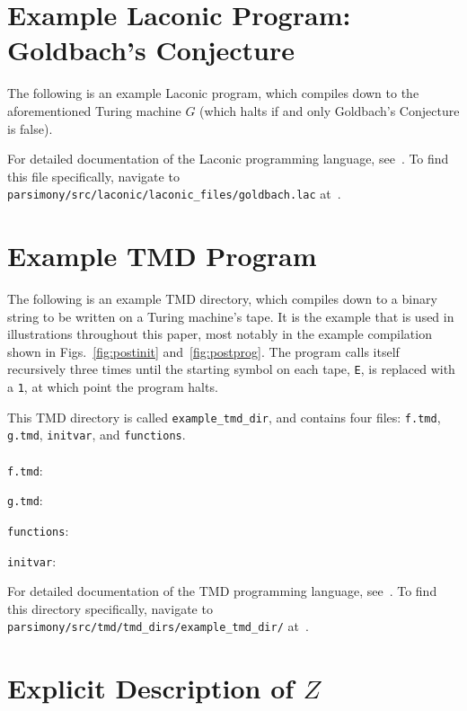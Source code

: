 \documentclass[11pt]{article}
\begin{document}
\begin{appendices}
    
\section{Example Laconic Program: Goldbach's Conjecture} \label{sec:applac}

The following is an example Laconic program, which compiles down to the aforementioned Turing machine $G$ (which halts if and only Goldbach's Conjecture is false).



For detailed documentation of the Laconic programming language, see~\cite{github}. To find this file specifically, navigate to \texttt{parsimony/src/laconic/laconic\_files/goldbach.lac} at~\cite{github}.

\section{Example TMD Program} \label{sec:apptmd}

The following is an example TMD directory, which compiles down to a binary string to be written on a Turing machine's tape. It is the example that is used in illustrations throughout this paper, most notably in the example compilation shown in Figs.~\ref{fig:postinit} and~\ref{fig:postprog}. The program calls itself recursively three times until the starting symbol on each tape, \texttt{E}, is replaced with a \texttt{1}, at which point the program halts.

This TMD directory is called \texttt{example\_tmd\_dir}, and contains four files: \texttt{f.tmd}, \texttt{g.tmd}, \texttt{initvar}, and \texttt{functions}. \\ \\

\texttt{f.tmd}:

\texttt{g.tmd}:

\texttt{functions}:

\texttt{initvar}:
 

For detailed documentation of the TMD programming language, see~\cite{github}. To find this directory specifically, navigate to \texttt{parsimony/src/tmd/tmd\_dirs/example\_tmd\_dir/} at~\cite{github}.

\section{Explicit Description of $Z$} \label{sec:explicitz}


\end{appendices}
\end{document}
